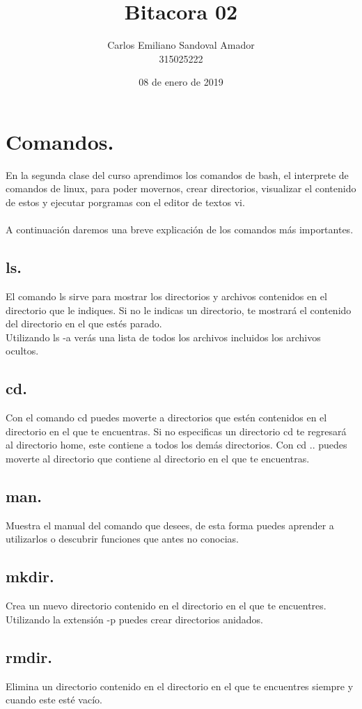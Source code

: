 \documentclass[letterpaper, 12pt, oneside]{article}%
\title{Bitacora 02}
\author{Carlos Emiliano Sandoval Amador \\ 315025222}
\date{08 de enero de 2019}
\begin{document}
	\maketitle %
	\section{Comandos.} %
	{En la segunda clase del curso aprendimos los comandos de bash, el interprete de comandos de linux, para poder movernos, crear directorios, visualizar el contenido de estos y ejecutar porgramas con el editor de textos vi.\\ \\ A continuación daremos una breve explicación de los comandos más importantes.\\}
	\subsection{ls.} %
	{El comando ls sirve para mostrar los directorios y archivos contenidos en el directorio que le indiques. Si no le indicas un directorio, te mostrará el contenido del directorio en el que estés parado. \\ Utilizando ls -a verás una lista de todos los archivos incluidos los archivos ocultos.}
	\subsection{cd.}
	{Con el comando cd puedes moverte a directorios que estén contenidos en el directorio en el que te encuentras. Si no especificas un directorio cd te regresará al directorio home, este contiene a todos los demás directorios. Con cd .. puedes moverte al directorio que contiene al directorio en el que te encuentras.}
	\subsection{man.}
	{Muestra el manual del comando que desees, de esta forma puedes aprender a utilizarlos o descubrir funciones que antes no conocias.}
	\subsection{mkdir.}
	{Crea un nuevo directorio contenido en el directorio en el que te encuentres. Utilizando la extensión -p puedes crear directorios anidados.}
	\subsection{rmdir.}
	{Elimina un directorio contenido en el directorio en el que te encuentres siempre y cuando este esté vacío.}
\end{document}
